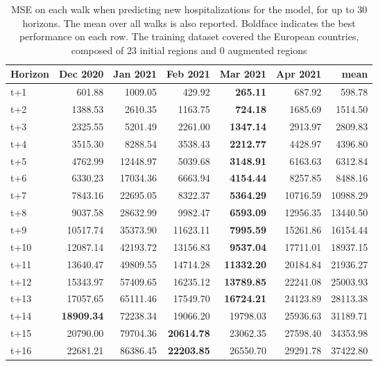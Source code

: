 \begin{table}[H]
\centering
\caption{MSE on each walk when predicting new hospitalizations for the model, for up to 30 horizons. The mean over all walks is also reported. Boldface indicates the best performance on each row. The training dataset covered the European countries, composed of 23 initial regions and 0 augmented regions }
\label{tab:MSE_walk_assembly_2}
\begin{tabular}{lrrrrrr}
\toprule
Horizon &  Dec 2020 &  Jan 2021 &  Feb 2021 &  Mar 2021 &  Apr 2021 &     mean \\
\midrule
t+1  & 601.88  & 1009.05  & 429.92  & \textbf{265.11}  & 687.92  & 598.78  \\
t+2  & 1388.53  & 2610.35  & 1163.75  & \textbf{724.18}  & 1685.69  & 1514.50  \\
t+3  & 2325.55  & 5201.49  & 2261.00  & \textbf{1347.14}  & 2913.97  & 2809.83  \\
t+4  & 3515.30  & 8288.54  & 3538.43  & \textbf{2212.77}  & 4428.97  & 4396.80  \\
t+5  & 4762.99  & 12448.97  & 5039.68  & \textbf{3148.91}  & 6163.63  & 6312.84  \\
t+6  & 6330.23  & 17034.36  & 6663.94  & \textbf{4154.44}  & 8257.85  & 8488.16  \\
t+7  & 7843.16  & 22695.05  & 8322.37  & \textbf{5364.29}  & 10716.59  & 10988.29  \\
t+8  & 9037.58  & 28632.99  & 9982.47  & \textbf{6593.09}  & 12956.35  & 13440.50  \\
t+9  & 10517.74  & 35373.90  & 11623.11  & \textbf{7995.59}  & 15261.86  & 16154.44  \\
t+10  & 12087.14  & 42193.72  & 13156.83  & \textbf{9537.04}  & 17711.01  & 18937.15  \\
t+11  & 13640.47  & 49809.55  & 14714.28  & \textbf{11332.20}  & 20184.84  & 21936.27  \\
t+12  & 15343.97  & 57409.65  & 16235.12  & \textbf{13789.85}  & 22241.08  & 25003.93  \\
t+13  & 17057.65  & 65111.46  & 17549.70  & \textbf{16724.21}  & 24123.89  & 28113.38  \\
t+14  & \textbf{18909.34}  & 72238.34  & 19066.20  & 19798.03  & 25936.63  & 31189.71  \\
t+15  & 20790.00  & 79704.36  & \textbf{20614.78}  & 23062.35  & 27598.40  & 34353.98  \\
t+16  & 22681.21  & 86386.45  & \textbf{22203.85}  & 26550.70  & 29291.78  & 37422.80  \\

\end{tabular}
\end{table}
